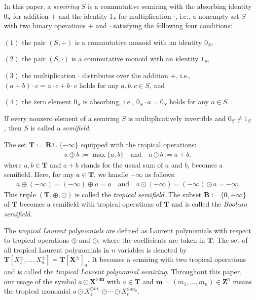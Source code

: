 \documentclass[a4paper,12pt]{amsart}
\theoremstyle{plain}
\theoremstyle{definition}
\begin{document}
In this paper, a \textit{semiring} $S$ is a commutative semiring with the absorbing identity $0_S$ for addition $+$ and the identity $1_S$ for multiplication $\cdot$, i.e., a nonempty set $S$ with two binary operations $+$ and $\cdot$ satisfying the following four conditions:

$(1)$ the pair $(S, +)$ is a commutative monoid with an identity $0_S$,

$(2)$ the pair $(S, \cdot)$ is a commutative monoid with an identity $1_S$,

$(3)$ the multiplication $\cdot$ distributes over the addition $+$, i.e., $(a + b) \cdot c = a \cdot c + b \cdot c$ holds for any $a,b, c \in S$, and

$(4)$ the zero element $0_S$ is absorbing, i.e., $0_S \cdot a = 0_S$ holds for any $a \in S$.

If every nonzero element of a semiring $S$ is multiplicatively invertible and $0_S \not= 1_S$, then $S$ is called a \textit{semifield}.

The set $\boldsymbol{T} := \boldsymbol{R} \cup \{ -\infty \}$ equipped with the tropical operations:
\begin{align*}
a \oplus b := \operatorname{max}\{ a, b \} \quad	\text{and} \quad a \odot b := a + b,
\end{align*}
where $a, b \in \boldsymbol{T}$ and $a + b$ stands for the usual sum of $a$ and $b$, becomes a semifield.
Here, for any $a \in \boldsymbol{T}$, we handle $-\infty$ as follows:
\begin{align*}
a \oplus (-\infty) = (-\infty) \oplus a = a \quad \text{and} \quad a \odot (-\infty) = (-\infty) \odot a = -\infty.
\end{align*}
This triple $(\boldsymbol{T}, \oplus, \odot)$ is called the \textit{tropical semifield}.
The subset $\boldsymbol{B} := \{ 0, -\infty \}$ of $\boldsymbol{T}$ becomes a semifield with tropical operations of $\boldsymbol{T}$ and is called the \textit{Boolean semifield}.

The \textit{tropical Laurent polynomials} are defined as Laurent polynomials with respect to tropical operations $\oplus$ and $\odot$, where the coefficients are taken in $\boldsymbol{T}$.
The set of all tropical Laurent polynomials in $n$ variables is denoted by $\boldsymbol{T}[X_1^{\pm}, \ldots, X_n^{\pm}] = \boldsymbol{T}[\boldsymbol{X}^{\pm}]_n$.
It becomes a semiring with two tropical operations and is called the \textit{tropical Laurent polynomial semiring}.
Throughout this paper, our usage of the symbol $a \odot \boldsymbol{X}^{\odot \boldsymbol{m}}$ with $a \in \boldsymbol{T}$ and $\boldsymbol{m} = (m_1, \ldots, m_n) \in \boldsymbol{Z}^n$ means the tropical monomial $a \odot X_1^{\odot m_1} \odot \cdots \odot X_n^{\odot m_n}$.
\end{document}
